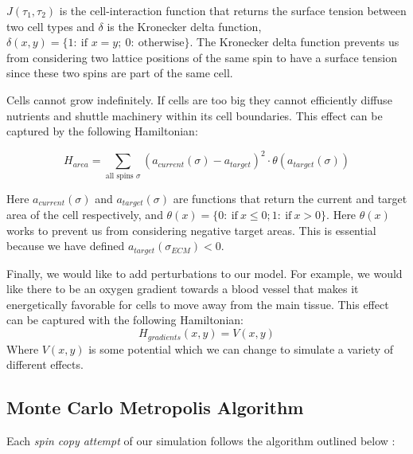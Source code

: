 \documentclass[12pt]{article}
\begin{document}
$J(\tau_1, \tau_2)$ is the cell-interaction function that returns the surface tension between two cell types and $\delta$ is the Kronecker delta function, $\delta(x,y)=\{1:~\text{if }x=y;~0:~\text{otherwise}\}$. The Kronecker delta function prevents us from considering two lattice positions of the same spin to have a surface tension since these two spins are part of the same cell.

Cells cannot grow indefinitely. If cells are too big they cannot efficiently diffuse nutrients and shuttle machinery within its cell boundaries. This effect can be captured by the following Hamiltonian:

\begin{equation}
	H_{area} = \sum_{\text{all spins }\sigma} (a_{current}(\sigma)-a_{target})^2 \cdot \theta(a_{target}(\sigma))
\end{equation}

Here $a_{current}(\sigma)$ and $a_{target}(\sigma)$ are functions that return the current and target area of the cell respectively, and $\theta(x)=\{0:~\text{if}~x\leq 0; 1:~\text{if}~x>0\}$. Here $\theta(x)$ works to prevent us from considering negative target areas. This is essential because we have defined $a_{target}(\sigma_{ECM}) < 0$.

Finally, we would like to add perturbations to our model. For example, we would like there to be an oxygen gradient towards a blood vessel that makes it energetically favorable for cells to move away from the main tissue. This effect can be captured with the following Hamiltonian:
\begin{equation}
	H_{gradients}(x,y) = V(x,y)
\end{equation}
Where $V(x,y)$ is some potential which we can change to simulate a variety of different effects.

\subsection{Monte Carlo Metropolis Algorithm}
Each \emph{spin copy attempt} of our simulation follows the algorithm outlined below \cite{Glazier2007}:
\end{document}
